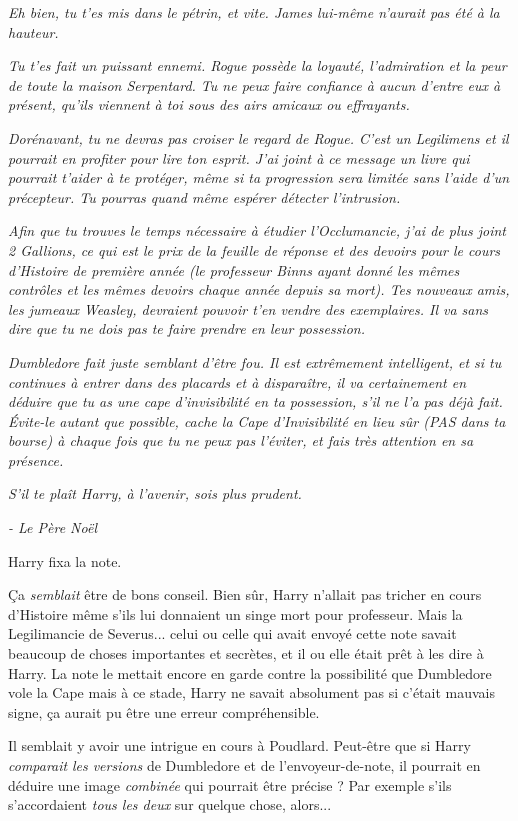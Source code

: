 \emph{Eh bien, tu t'es mis dans le pétrin, et vite. James lui-même n'aurait pas été à la hauteur.} 

\emph{Tu t'es fait un puissant ennemi. Rogue possède la loyauté, l'admiration et la peur de toute la maison Serpentard. Tu ne peux faire confiance à aucun d'entre eux à présent, qu'ils viennent à toi sous des airs amicaux ou effrayants.} 

\emph{Dorénavant, tu ne devras pas croiser le regard de Rogue. C'est un Legilimens et il pourrait en profiter pour lire ton esprit. J'ai joint à ce message un livre qui pourrait t'aider à te protéger, même si ta progression sera limitée sans l'aide d'un précepteur. Tu pourras quand même espérer détecter l'intrusion.} 

\emph{Afin que tu trouves le temps nécessaire à étudier l'Occlumancie, j'ai de plus joint 2 Gallions, ce qui est le prix de la feuille de réponse et des devoirs pour le cours d'Histoire de première année (le professeur Binns ayant donné les mêmes contrôles et les mêmes devoirs chaque année depuis sa mort). Tes nouveaux amis, les jumeaux Weasley, devraient pouvoir t'en vendre des exemplaires. Il va sans dire que tu ne dois pas te faire prendre en leur possession.} 

\emph{Dumbledore fait juste semblant d'être fou. Il est extrêmement intelligent, et si tu continues à entrer dans des placards et à disparaître, il va certainement en déduire que tu as une cape d'invisibilité en ta possession, s'il ne l'a pas déjà fait. Évite-le autant que possible, cache la Cape d'Invisibilité en lieu sûr (PAS dans ta bourse) à chaque fois que tu ne peux pas l'éviter, et fais très attention en sa présence.} 

\emph{S'il te plaît Harry, à l'avenir, sois plus prudent.} 

\emph{- Le Père Noël} 

Harry fixa la note.

Ça \emph{semblait}  être de bons conseil. Bien sûr, Harry n'allait pas tricher en cours d'Histoire même s'ils lui donnaient un singe mort pour professeur. Mais la Legilimancie de Severus... celui ou celle qui avait envoyé cette note savait beaucoup de choses importantes et secrètes, et il ou elle était prêt à les dire à Harry. La note le mettait encore en garde contre la possibilité que Dumbledore vole la Cape mais à ce stade, Harry ne savait absolument pas si c'était mauvais signe, ça aurait pu être une erreur compréhensible.

Il semblait y avoir une intrigue en cours à Poudlard. Peut-être que si Harry \emph{comparait}  \emph{les versions}  de Dumbledore et de l'envoyeur-de-note, il pourrait en déduire une image \emph{combinée}  qui pourrait être précise ? Par exemple s'ils s'accordaient \emph{tous les deux } sur quelque chose, alors...

